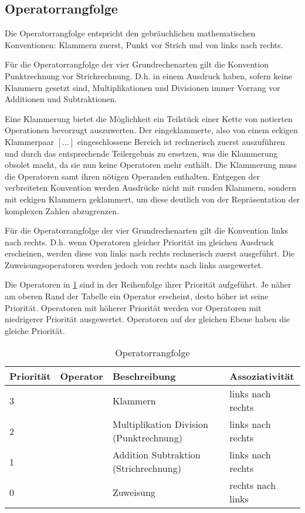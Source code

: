 \documentclass{sdqassignment}
\begin{document}
\subsection{Operatorrangfolge}
Die Operatorrangfolge entspricht den gebräuchlichen mathematischen Konventionen:
Klammern zuerst, Punkt vor Strich und von links nach rechts.

Für die Operatorrangfolge der vier Grundrechenarten gilt die Konvention Punktrechnung vor Strichrechnung. D.h. in einem Ausdruck haben, sofern keine Klammern gesetzt sind, Multiplikationen und Divisionen immer Vorrang vor Additionen und Subtraktionen.

Eine Klammerung bietet die Möglichkeit ein Teilstück einer Kette von notierten Operationen bevorzugt auszuwerten. %
Der eingeklammerte, also von einem eckigen Klammerpaar \([\ldots]\) eingeschlossene Bereich ist rechnerisch zuerst auszuführen und durch das entsprechende Teilergebnis zu ersetzen, was die Klammerung obsolet macht, da sie nun keine Operatoren mehr enthält. Die Klammerung muss die Operatoren samt ihren nötigen Operanden enthalten. Entgegen der verbreiteten Konvention werden Ausdrücke nicht mit runden Klammern, sondern mit eckigen Klammern geklammert, um diese deutlich von der Repräsentation der komplexen Zahlen abzugrenzen.

Für die Operatorrangfolge der vier Grundrechenarten gilt die Konvention links nach rechts. D.h. wenn Operatoren gleicher Priorität im gleichen Ausdruck erscheinen, werden diese von links nach rechts rechnerisch zuerst ausgeführt.
Die Zuweisungsoperatoren werden jedoch von rechts nach links ausgewertet.

Die Operatoren in \cref{tab:operator} sind in der Reihenfolge ihrer Priorität aufgeführt. Je näher am oberen Rand der Tabelle ein Operator erscheint, desto höher ist seine Priorität. Operatoren mit höherer Priorität werden vor Operatoren mit niedrigerer Priorität ausgewertet. Operatoren auf der gleichen Ebene haben die gleiche Priorität.

\begin{table}[]
    \centering
    \begin{tabular}{|l|l|l|l|}
    \hline
    Priorität & Operator & Beschreibung & Assoziativität \\ \hline
    3 & \lstinlinetxt{[} \lstinlinetxt{]} & Klammern & links nach rechts \\ \hline
    2 & \lstinlinetxt{*} \lstinlinetxt{/} & Multiplikation Division (Punktrechnung) & links nach rechts \\ \hline
    1 & \lstinlinetxt{+} \lstinlinetxt{-} & Addition Subtraktion (Strichrechnung) & links nach rechts \\ \hline
    0 & \lstinlinetxt{=} & Zuweisung & rechts nach links \\ \hline
    \end{tabular}
    \caption{Operatorrangfolge}
    \label{tab:operator}
\end{table}
\end{document}
